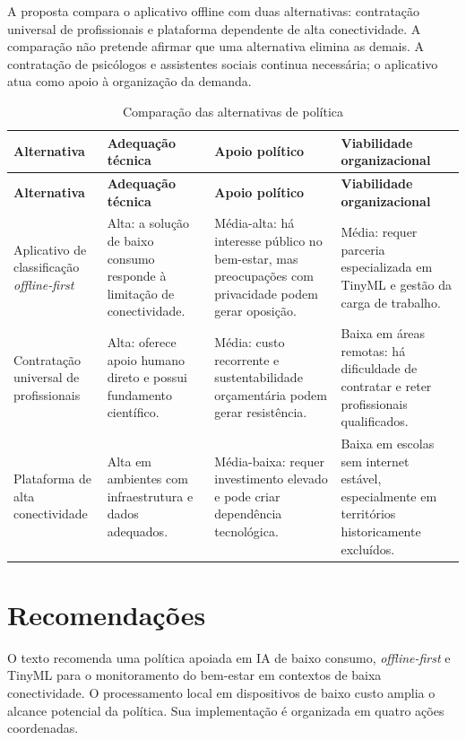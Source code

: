 A proposta compara o aplicativo offline com duas alternativas: contratação
universal de profissionais e plataforma dependente de alta conectividade. A
comparação não pretende afirmar que uma alternativa elimina as demais. A
contratação de psicólogos e assistentes sociais continua necessária; o
aplicativo atua como apoio à organização da demanda.

\begin{longtable}{p{3.0cm}p{3.3cm}p{3.3cm}p{3.3cm}}
\caption{Comparação das alternativas de política}\label{tab:alternativas-artigo}\\
\toprule
\textbf{Alternativa} & \textbf{Adequação técnica} & \textbf{Apoio político} & \textbf{Viabilidade organizacional} \\
\midrule
\endfirsthead
\toprule
\textbf{Alternativa} & \textbf{Adequação técnica} & \textbf{Apoio político} & \textbf{Viabilidade organizacional} \\
\midrule
\endhead
Aplicativo de classificação \emph{offline-first}
& Alta: a solução de baixo consumo responde à limitação de conectividade.
& Média-alta: há interesse público no bem-estar, mas preocupações com privacidade podem gerar oposição.
& Média: requer parceria especializada em TinyML e gestão da carga de trabalho. \\
\addlinespace
Contratação universal de profissionais
& Alta: oferece apoio humano direto e possui fundamento científico.
& Média: custo recorrente e sustentabilidade orçamentária podem gerar resistência.
& Baixa em áreas remotas: há dificuldade de contratar e reter profissionais qualificados. \\
\addlinespace
Plataforma de alta conectividade
& Alta em ambientes com infraestrutura e dados adequados.
& Média-baixa: requer investimento elevado e pode criar dependência tecnológica.
& Baixa em escolas sem internet estável, especialmente em territórios historicamente excluídos. \\
\bottomrule
\end{longtable}

\section{Recomendações}

O texto recomenda uma política apoiada em IA de baixo consumo,
\emph{offline-first} e TinyML para o monitoramento do bem-estar em contextos de
baixa conectividade. O processamento local em dispositivos de baixo custo amplia
o alcance potencial da política. Sua implementação é organizada em quatro ações
coordenadas.

